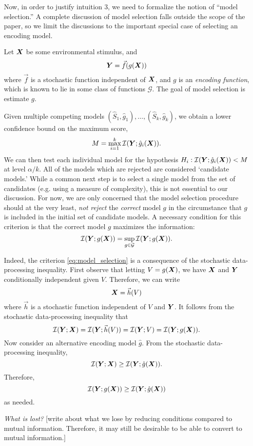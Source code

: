 \documentclass[12pt]{article}
\begin{document}
Now, in order to justify intuition 3, we need to formalize the notion
of ``model selection.''  A complete discussion of model selection
falls outside the scope of the paper, so we limit the discussions
to the important special case of selecting an encoding model.

Let $\boldsymbol{X}$ be some environmental stimulus, and
\[
\boldsymbol{Y} = \vec{f}(g(\boldsymbol{X}))
\]
where $\vec{f}$ is a stochastic function independent of $\boldsymbol{X}$, and $g$ is
an \emph{encoding function}, which is known to lie in some class of
functions $\mathcal{G}$.  The goal of model selection is estimate $g$.

Given multiple competing models $(\hat{S}_1, \hat{g}_1),\hdots,
(\hat{S}_k, \hat{g}_k)$, we obtain a lower confidence bound on the maximum score,
\[
M = \max_{i=1}^k \mathcal{I}(\boldsymbol{Y}; \hat{g}_i(\boldsymbol{X})).
\]
We can then test each individual model for the hypothesis
$H_i: \mathcal{I}(\boldsymbol{Y}; \hat{g}_i(\boldsymbol{X})) < M$ at level $\alpha/k$.  All of the models which
are rejected are considered `candidate models.'  While a common next
step is to select a single model from the set of candidates
(e.g. using a measure of complexity), this is not essential to our
discussion.  For now, we are only concerned that the model selection
procedure should at the very least, \emph{not reject}
the \emph{correct} model $g$ in the circumstance that $g$ is included
in the initial set of candidate models.  A necessary condition for
this criterion is that the correct model $g$ maximizes the
information:
\begin{equation}\label{eq:model_selection}
\mathcal{I}(\boldsymbol{Y}; g(\boldsymbol{X})) = \sup_{g \in \mathcal{G}} \mathcal{I}(\boldsymbol{Y}; g(\boldsymbol{X})).
\end{equation}

Indeed, the criterion \eqref{eq:model_selection} is a consequence of
the stochastic data-processing inequality.  First observe that letting
$V = g(\boldsymbol{X})$, we have $\boldsymbol{X}$ and $\boldsymbol{Y}$ conditionally independent given
$V$.  Therefore, we can write
\[
\boldsymbol{X} = \vec{h}(V)
\]
where $\vec{h}$ is a stochastic function independent of $V$ and $\boldsymbol{Y}$.
It follows from the stochastic data-processing inequality that
\[
\mathcal{I}(\boldsymbol{Y}; \boldsymbol{X}) = \mathcal{I}(\boldsymbol{Y}; \vec{h}(V)) = \mathcal{I}(\boldsymbol{Y}; V) = \mathcal{I}(\boldsymbol{Y}; g(\boldsymbol{X})).
\]
Now consider an alternative encoding model $\hat{g}$.  From the stochastic data-processing inequality,
\[
\mathcal{I}(\boldsymbol{Y}; \boldsymbol{X}) \geq \mathcal{I}(\boldsymbol{Y}; \hat{g}(\boldsymbol{X})).
\]
Therefore,
\[
\mathcal{I}(\boldsymbol{Y}; g(\boldsymbol{X})) \geq \mathcal{I}(\boldsymbol{Y}; \hat{g}(\boldsymbol{X}))
\]
as needed.

\emph{What is lost?} 
[write about what we lose by reducing conditions compared to mutual
information.  Therefore, it may still be desirable to be able to
convert to mutual information.]
\end{document}

